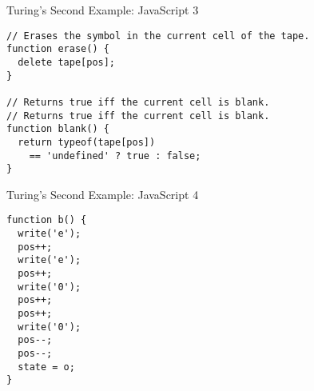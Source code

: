 \begin{frame}[fragile]{Turing's Second Example: JavaScript 3}
\begin{verbatim}
// Erases the symbol in the current cell of the tape.
function erase() {
  delete tape[pos];
}

// Returns true iff the current cell is blank.
// Returns true iff the current cell is blank.
function blank() {
  return typeof(tape[pos])
    == 'undefined' ? true : false;
}
\end{verbatim}
\end{frame}

\begin{frame}[fragile]{Turing's Second Example: JavaScript 4}
\begin{verbatim}
function b() {
  write('e');
  pos++;
  write('e');
  pos++;
  write('0');
  pos++;
  pos++;
  write('0');
  pos--;
  pos--;
  state = o;
}
\end{verbatim}
\end{frame}

